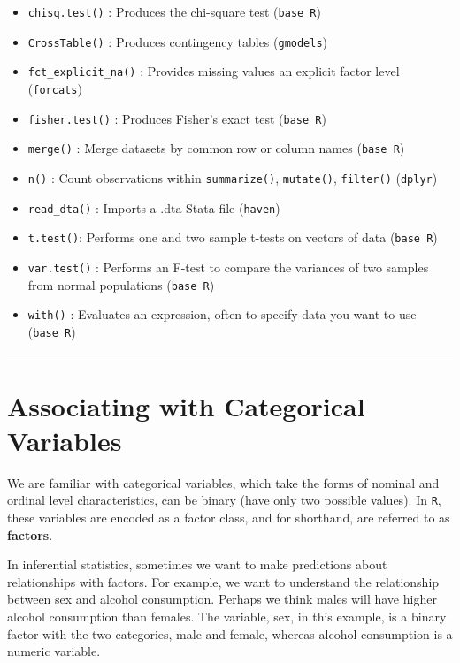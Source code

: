 \documentclass[
]{book}
\providecommand{\tightlist}{%
  \setlength{\itemsep}{0pt}\setlength{\parskip}{0pt}}
\begin{document}
\begin{itemize}
\tightlist
\item
  \texttt{chisq.test()} : Produces the chi-square test (\texttt{base\ R})
\item
  \texttt{CrossTable()} : Produces contingency tables (\texttt{gmodels})
\item
  \texttt{fct\_explicit\_na()} : Provides missing values an explicit factor level (\texttt{forcats})
\item
  \texttt{fisher.test()} : Produces Fisher's exact test (\texttt{base\ R})
\item
  \texttt{merge()} : Merge datasets by common row or column names (\texttt{base\ R})
\item
  \texttt{n()} : Count observations within \texttt{summarize()}, \texttt{mutate()}, \texttt{filter()} (\texttt{dplyr})
\item
  \texttt{read\_dta()} : Imports a .dta Stata file (\texttt{haven})
\item
  \texttt{t.test()}: Performs one and two sample t-tests on vectors of data (\texttt{base\ R})
\item
  \texttt{var.test()} : Performs an F-test to compare the variances of two samples from normal populations (\texttt{base\ R})
\item
  \texttt{with()} : Evaluates an expression, often to specify data you want to use (\texttt{base\ R})
\end{itemize}

\begin{center}\rule{0.5\linewidth}{0.5pt}\end{center}

\hypertarget{associating-with-categorical-variables}{%
\section{Associating with Categorical Variables}\label{associating-with-categorical-variables}}

We are familiar with categorical variables, which take the forms of nominal and ordinal level characteristics, can be binary (have only two possible values). In \texttt{R}, these variables are encoded as a factor class, and for shorthand, are referred to as \textbf{factors}.

In inferential statistics, sometimes we want to make predictions about relationships with factors. For example, we want to understand the relationship between sex and alcohol consumption. Perhaps we think males will have higher alcohol consumption than females. The variable, sex, in this example, is a binary factor with the two categories, male and female, whereas alcohol consumption is a numeric variable.
\end{document}
